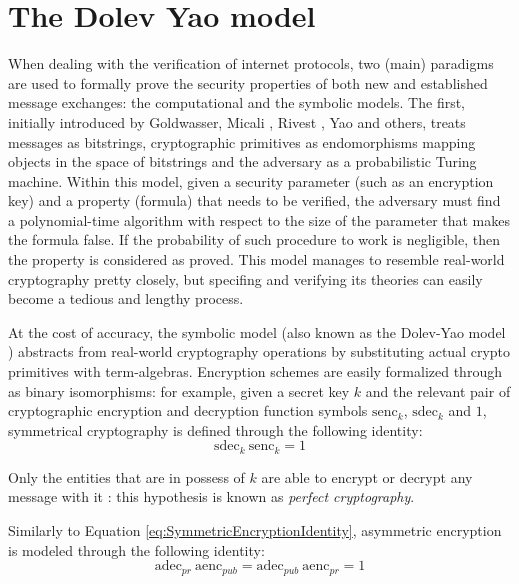 \documentclass[fleqn,10pt]{SelfArx} %
\begin{document}
\section{The Dolev Yao model}\label{sec:SymbolicModel}

When dealing with the verification of internet protocols, two (main) paradigms are used to formally prove the security properties of both new and established message exchanges: the computational and the symbolic models. The first, initially introduced by Goldwasser, Micali \cite{goldwasser}, Rivest \cite{rivest}, Yao \cite{yao} and others, treats messages as bitstrings, cryptographic primitives as endomorphisms mapping objects in the space of bitstrings and the adversary as a probabilistic Turing machine. Within this model, given a security parameter (such as an encryption key) and a property (formula) that needs to be verified, the adversary must find a polynomial-time algorithm with respect to the size of the parameter that makes the formula false. If the probability of such procedure to work is negligible, then the property is considered as proved. This model manages to resemble real-world cryptography pretty closely, but specifing and verifying its theories can easily become a tedious and lengthy process.

At the cost of accuracy, the symbolic model (also known as the Dolev-Yao model \cite{DolevYao}) abstracts from real-world cryptography operations by substituting actual crypto primitives with term-algebras. Encryption schemes are easily formalized through as binary isomorphisms: for example, given a secret key $k$ and the relevant pair of cryptographic encryption and decryption function symbols $\textrm{senc}_k$, $\textrm{sdec}_k$ and $1$, symmetrical cryptography is defined through the following identity:
\begin{equation}\label{eq:SymmetricEncryptionIdentity}
    \textrm{sdec}_k\ \textrm{senc}_k = 1
\end{equation}

Only the entities that are in possess of $k$ are able to encrypt or decrypt any message with it \cite{BBSecurityProtocolVerification}: this hypothesis is known as \textit{perfect cryptography}.

Similarly to Equation \ref{eq:SymmetricEncryptionIdentity}, asymmetric encryption is modeled through the following identity:
\begin{equation}\label{eq:AsymmetricEncryptionIdentity}
    \textrm{adec}_{pr}\ \textrm{aenc}_{pub} = \textrm{adec}_{pub}\ \textrm{aenc}_{pr} = 1
\end{equation}
\end{document}
